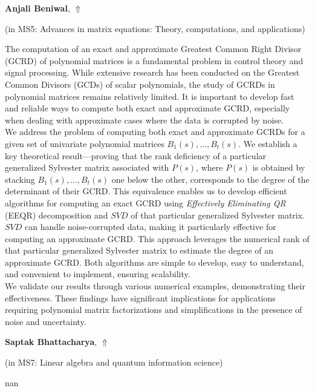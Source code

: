 \documentclass[ILAS2025-program.tex]{subfiles}
\begin{document}
\hypertarget{down0365}{}\begin{ilasabstract}
    
\textbf{Anjali Beniwal},  \hfill \hyperlink{up0365}{$\Uparrow$}
    
    
(in {\color{mstitle}MS5: Advances in matrix equations: Theory, computations, and applications})
        
\mtskip
    The computation of an exact and approximate Greatest Common Right Divisor (GCRD) of polynomial matrices is a fundamental problem in control theory and signal processing. While extensive research has been conducted on the Greatest Common Divisors (GCDs) of scalar polynomials, the study of GCRDs in polynomial matrices remains relatively limited. It is important to develop fast and reliable ways to compute both exact and approximate GCRD, especially when dealing with approximate cases where the data is corrupted by noise.\\
We address the problem of computing both exact and approximate GCRDs for a given set of univariate polynomial matrices $B_1(s), \dots, B_t(s)$. We establish a key theoretical result—proving that the rank deficiency of a particular generalized Sylvester matrix associated with $P(s)$, where $P(s)$ is obtained by stacking $B_1(s), \dots, B_t(s)$ one below the other, corresponds to the degree of the determinant of their GCRD. This equivalence enables us to develop efficient algorithms for computing an exact GCRD using \textit{Effectively Eliminating QR} (EEQR) decomposition and $SVD$ of that particular generalized Sylvester matrix. $SVD$ can handle noise-corrupted data, making it particularly effective for computing an approximate GCRD. This approach leverages the numerical rank of that particular generalized Sylvester matrix to estimate the degree of an approximate GCRD. Both algorithms are simple to develop, easy to understand, and convenient to implement, ensuring scalability.\\
We validate our results through various numerical examples, demonstrating their effectiveness. These findings have significant implications for applications requiring polynomial matrix factorizations and simplifications in the presence of noise and uncertainty.
\end{ilasabstract}
    

\hypertarget{down0207}{}\begin{ilasabstract}
    
\textbf{Saptak Bhattacharya},  \hfill \hyperlink{up0207}{$\Uparrow$}
    
    
(in {\color{mstitle}MS7: Linear algebra and quantum information science})
        
\mtskip
    nan
\end{ilasabstract}
    
\end{document}
